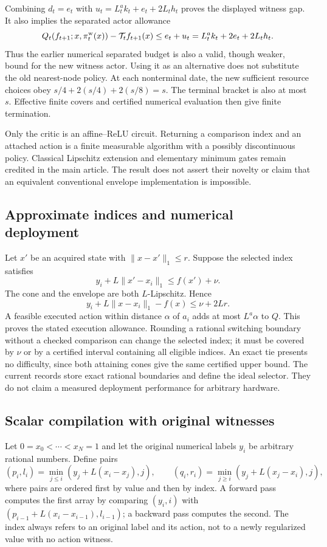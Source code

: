 Combining $d_t=e_t$ with $u_t=L_t^ak_t+e_t+2L_th_t$ proves the displayed witness gap. It also implies the separated actor allowance
\[
 Q_t(f_{t+1};x,\pi_t^{\rm w}(x))-\mathcal T_tf_{t+1}(x)
 \le e_t+u_t=L_t^ak_t+2e_t+2L_th_t.
\]
Thus the earlier numerical separated budget is also a valid, though weaker, bound for the new witness actor. Using it as an alternative does not substitute the old nearest-node policy. At each nonterminal date, the new sufficient resource choices obey $s/4+2(s/4)+2(s/8)=s$. The terminal bracket is also at most $s$. Effective finite covers and certified numerical evaluation then give finite termination.

Only the critic is an affine--ReLU circuit. Returning a comparison index and an attached action is a finite measurable algorithm with a possibly discontinuous policy. Classical Lipschitz extension and elementary minimum gates remain credited in the main article. The result does not assert their novelty or claim that an equivalent conventional envelope implementation is impossible.

\subsection{Approximate indices and numerical deployment}
Let $x'$ be an acquired state with $\|x-x'\|_1\le r$. Suppose the selected index satisfies
\[
 y_i+L\|x'-x_i\|_1\le f(x')+\nu.
\]
The cone and the envelope are both $L$-Lipschitz. Hence
\[
 y_i+L\|x-x_i\|_1-f(x)
 \le \nu+2Lr.
\]
A feasible executed action within distance $\alpha$ of $a_i$ adds at most $L^a\alpha$ to $Q$. This proves the stated execution allowance. Rounding a rational switching boundary without a checked comparison can change the selected index; it must be covered by $\nu$ or by a certified interval containing all eligible indices. An exact tie presents no difficulty, since both attaining cones give the same certified upper bound. The current records store exact rational boundaries and define the ideal selector. They do not claim a measured deployment performance for arbitrary hardware.

\subsection{Scalar compilation with original witnesses}
Let $0=x_0<\cdots<x_N=1$ and let the original numerical labels $y_i$ be arbitrary rational numbers. Define pairs
\[
 (p_i,l_i)=\min_{j\le i}(y_j+L(x_i-x_j),j),\qquad
 (q_i,r_i)=\min_{j\ge i}(y_j+L(x_j-x_i),j),
\]
where pairs are ordered first by value and then by index. A forward pass computes the first array by comparing $(y_i,i)$ with $(p_{i-1}+L(x_i-x_{i-1}),l_{i-1})$; a backward pass computes the second. The index always refers to an original label and its action, not to a newly regularized value with no action witness.

